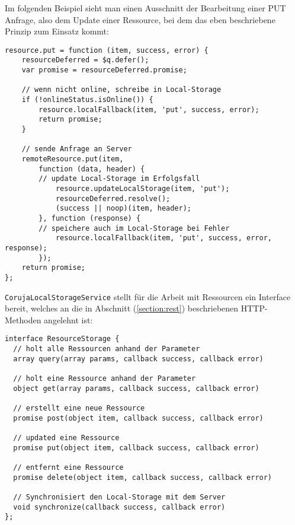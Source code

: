 Im folgenden Beispiel sieht man einen Ausschnitt der Bearbeitung einer PUT Anfrage, also dem Update einer Ressource, bei dem das eben beschriebene Prinzip zum Einsatz kommt:
\begin{lstlisting}
resource.put = function (item, success, error) {
    resourceDeferred = $q.defer();
    var promise = resourceDeferred.promise;

    // wenn nicht online, schreibe in Local-Storage
    if (!onlineStatus.isOnline()) {
        resource.localFallback(item, 'put', success, error);
        return promise;
    }

    // sende Anfrage an Server
    remoteResource.put(item,
        function (data, header) {
	    // update Local-Storage im Erfolgsfall
            resource.updateLocalStorage(item, 'put');
            resourceDeferred.resolve();
            (success || noop)(item, header);
        }, function (response) {
	    // speichere auch im Local-Storage bei Fehler
            resource.localFallback(item, 'put', success, error, response);
        });
    return promise;
}; 
\end{lstlisting}
\texttt{CorujaLocalStorageService} stellt für die Arbeit mit Ressourcen ein Interface bereit, welches an die in Abschnitt (\ref{section:rest}) beschriebenen HTTP-Methoden angelehnt ist:
\begin{lstlisting}           
interface ResourceStorage {
  // holt alle Ressourcen anhand der Parameter
  array query(array params, callback success, callback error)
  
  // holt eine Ressource anhand der Parameter
  object get(array params, callback success, callback error) 
  
  // erstellt eine neue Ressource
  promise post(object item, callback success, callback error)
  
  // updated eine Ressource
  promise put(object item, callback success, callback error) 
  
  // entfernt eine Ressource
  promise delete(object item, callback success, callback error) 
  
  // Synchronisiert den Local-Storage mit dem Server
  void synchronize(callback success, callback error)
};             
\end{lstlisting}

